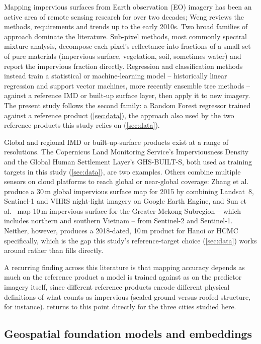 \documentclass[11pt,a4paper]{article}
\begin{document}
Mapping impervious surfaces from Earth observation (EO) imagery has been an
active area of remote sensing research for over two decades; Weng
\citep{weng2012impervious} reviews the methods, requirements and trends up to
the early 2010s. Two broad families of approach dominate the literature.
Sub-pixel methods, most commonly spectral mixture analysis, decompose each
pixel's reflectance into fractions of a small set of pure materials
(impervious surface, vegetation, soil, sometimes water) and report the
impervious fraction directly. Regression and classification methods instead
train a statistical or machine-learning model -- historically linear
regression and support vector machines, more recently ensemble
tree methods -- against a reference IMD or built-up surface layer, then apply
it to new imagery. The present study follows the second family: a
Random Forest regressor trained against a reference product (\cref{sec:data}),
the approach also used by the two reference products this study relies on
(\cref{sec:data}).

Global and regional IMD or built-up-surface products exist at a range of
resolutions. The Copernicus Land Monitoring Service's Imperviousness Density
and the Global Human Settlement Layer's GHS-BUILT-S, both used as training
targets in this study (\cref{sec:data}), are two examples. Others combine
multiple sensors on cloud platforms to reach global or near-global coverage:
Zhang et al.\ \citep{zhang2020global30m} produce a 30\,m global impervious
surface map for 2015 by combining Landsat~8, Sentinel-1 and VIIRS night-light
imagery on Google Earth Engine, and Sun et al.\ \citep{sun2023mekong} map
10\,m impervious surface for the Greater Mekong Subregion -- which includes
northern and southern Vietnam -- from Sentinel-2 and Sentinel-1. Neither,
however, produces a 2018-dated, 10\,m product for Hanoi or HCMC specifically,
which is the gap this study's reference-target choice (\cref{sec:data}) works
around rather than fills directly.

A recurring finding across this literature is that mapping accuracy depends
as much on the reference product a model is trained against as on the
predictor imagery itself, since different reference products encode
different physical definitions of what counts as impervious (sealed ground
versus roofed structure, for instance).  returns to this
point directly for the three cities studied here.

\subsection{Geospatial foundation models and embeddings}
\label{sec:intro-fm}
\end{document}

